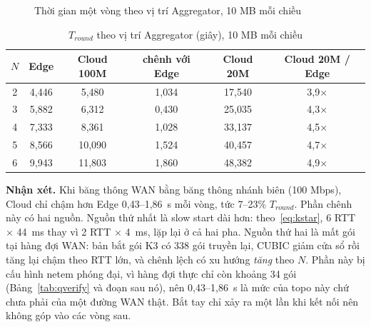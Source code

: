 \begin{figure}[H]
    \centering
    \caption{Thời gian một vòng theo vị trí Aggregator, 10 MB mỗi chiều}
    \label{fig:q3}
\end{figure}

\begin{table}[H]
    \centering
    \caption{$T_{round}$ theo vị trí Aggregator (giây), 10 MB mỗi chiều}
    \label{tab:q3}
    \begin{tabular}{c c c c c c}
        \toprule
        $N$ & \textbf{Edge} & \textbf{Cloud 100M} & \textbf{chênh với Edge} & \textbf{Cloud 20M} & \textbf{Cloud 20M / Edge} \\
        \midrule
        2 & 4,446 & 5,480 & 1,034 & 17,540 & 3,9$\times$ \\
        3 & 5,882 & 6,312 & 0,430 & 25,035 & 4,3$\times$ \\
        4 & 7,333 & 8,361 & 1,028 & 33,137 & 4,5$\times$ \\
        5 & 8,566 & 10,090 & 1,524 & 40,457 & 4,7$\times$ \\
        6 & 9,943 & 11,803 & 1,860 & 48,382 & 4,9$\times$ \\
        \bottomrule
    \end{tabular}
\end{table}

\textbf{Nhận xét.} Khi băng thông WAN bằng băng thông nhánh biên (100 Mbps), Cloud chỉ chậm hơn Edge 0{,}43--1{,}86~s mỗi vòng, tức 7--23\% $T_{round}$. Phần chênh này có hai nguồn. Nguồn thứ nhất là slow start dài hơn: theo~\eqref{eq:kstar}, 6 RTT $\times$ 44~ms thay vì 2 RTT $\times$ 4~ms, lặp lại ở cả hai pha. Nguồn thứ hai là mất gói tại hàng đợi WAN: bản bắt gói K3 có 338 gói truyền lại, CUBIC giảm cửa sổ rồi tăng lại chậm theo RTT lớn, và chênh lệch có xu hướng \emph{tăng} theo $N$. Phần này bị cấu hình netem phóng đại, vì hàng đợi thực chỉ còn khoảng 34 gói (Bảng~\ref{tab:qverify} và đoạn sau nó), nên 0{,}43--1{,}86~s là mức của topo này chứ chưa phải của một đường WAN thật. Bắt tay chỉ xảy ra một lần khi kết nối nên không góp vào các vòng sau.

